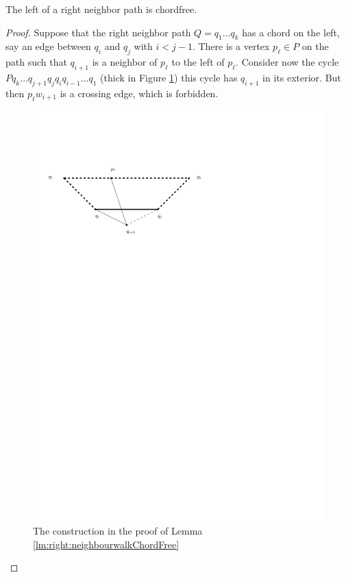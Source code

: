     \begin{lemma}
      \label{lm:right:neighbourwalkChordFree}
      The left of a right neighbor path is chordfree.
    \end{lemma}
    \begin{proof}
      Suppose that the right neighbor path $Q = q_1 \ldots q_k$  has a chord on the left, say an edge between $q_i$ and $q_j$ with $i< j -1 $. There is a vertex $p_\ell \in P$ on the path such that $q_{i+1}$ is a neighbor of $p_\ell$ to the left of $p_\ell$. Consider now the cycle $P q_k \ldots q_{j+1} q_j q_i q_{i-1} \ldots q_1$
      (thick in Figure \ref{fig:uni:neihbourwalkChordFree}) this cycle has $q_{i+1}$ in its exterior. But then $p_\ell w_{i+1}$ is a crossing edge, which is forbidden.

      \begin{figure}[h]
        \centering
        \includegraphics[scale=1]{unifiedAlgo/img/neighbourWalkChords}
        \caption{The construction in the proof of Lemma \ref{lm:right:neighbourwalkChordFree}}
        \label{fig:uni:neihbourwalkChordFree}
      \end{figure}
    \end{proof}
